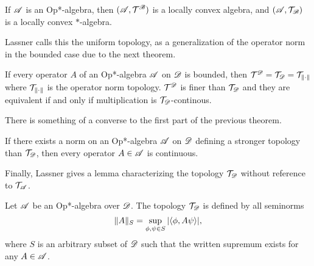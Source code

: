 \documentclass[../main.tex]{subfiles}
\begin{document}
\begin{theorem}

If $\mathscr{A}$ is an Op*-algebra, then $(\mathscr{A}, \mathcal{T}^\mathscr{B})$ is a locally convex algebra, and $(\mathscr{A}, \mathcal{T}_\mathscr{B})$ is a locally
convex $\ast$-algebra.

\end{theorem}

Lassner calls this the uniform topology, as a generalization of the operator norm in the bounded case due to the next theorem.

\begin{theorem}

	If every operator $A$ of an Op*-algebra $\mathscr{A}$ on $\mathscr{D}$ is bounded, then $\mathcal{T}^\mathscr{D} = \mathcal{T}_\mathscr{D} = \mathcal{T}_{\left\lVert\cdot\right\rVert}$
	where $\mathcal{T}_{\left\lVert\cdot\right\rVert}$ is the operator norm topology. $\mathcal{T}^\mathscr{D}$ is finer than $\mathcal{T}_\mathscr{D}$ and they are equivalent if and 
	only if multiplication is $\mathcal{T}_\mathscr{D}$-continous.

\end{theorem}


There is something of a converse to the first part of the previous theorem.

\begin{theorem}

If there exists a norm on an Op*-algebra $\mathscr{A}$ on $\mathscr{D}$ defining a stronger topology than $\mathcal{T}_\mathscr{D}$, then every operator $A \in \mathscr{A}$
is continuous.

\end{theorem}

Finally, Lassner gives a lemma characterizing the topology $\mathcal{T}_\mathscr{D}$ without reference to $\mathcal{T}_\mathscr{A}$.

\begin{lemma}

	Let $\mathscr{A}$ be an Op*-algebra over $\mathscr{D}$. The topology $\mathcal{T}_\mathscr{D}$ is defined by all seminorms 
	\[\|A\|_S = \sup_{\phi, \psi \in S}|\langle \phi, A\psi \rangle|,\] where $S$ is an arbitrary subset of $\mathscr{D}$ such that
	the written supremum exists for any $A \in \mathscr{A}$.


\end{lemma}
\end{document}
